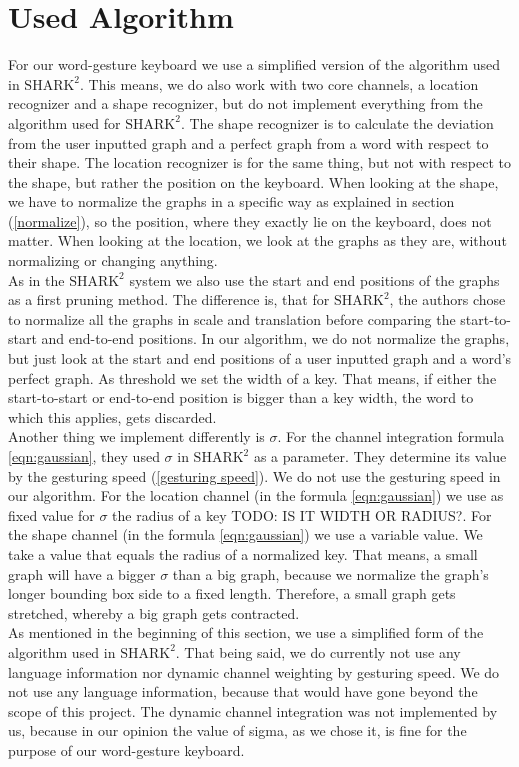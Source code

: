 \section{Used Algorithm}
For our word-gesture keyboard we use a simplified version of the algorithm used in $\text{SHARK}^2$. This means, we do also work with two core channels, a location recognizer and a shape recognizer, but do not implement everything from the algorithm used for $\text{SHARK}^2$. The shape recognizer is to calculate the deviation from the user inputted graph and a perfect graph from a word with respect to their shape. The location recognizer is for the same thing, but not with respect to the shape, but rather the position on the keyboard. When looking at the shape, we have to normalize the graphs in a specific way as explained in section (\ref{normalize}), so the position, where they exactly lie on the keyboard, does not matter. When looking at the location, we look at the graphs as they are, without normalizing or changing anything.\\
As in the $\text{SHARK}^2$ system we also use the start and end positions of the graphs as a first pruning method. The difference is, that for $\text{SHARK}^2$, the authors chose to normalize all the graphs in scale and translation before comparing the start-to-start and end-to-end positions. In our algorithm, we do not normalize the graphs, but just look at the start and end positions of a user inputted graph and a word's perfect graph. As threshold we set the width of a key. That means, if either the start-to-start or end-to-end position is bigger than a key width, the word to which this applies, gets discarded.\\
Another thing we implement differently is $\sigma$. For the channel integration formula \ref{eqn:gaussian}, they used $\sigma$ in $\text{SHARK}^2$ as a parameter. They determine its value by the gesturing speed (\ref{gesturing speed}). We do not use the gesturing speed in our algorithm. For the location channel (in the formula \ref{eqn:gaussian}) we use as fixed value for $\sigma$ the radius of a key TODO: IS IT WIDTH OR RADIUS?. For the shape channel (in the formula \ref{eqn:gaussian}) we use a variable value. We take a value that equals the radius of a normalized key. That means, a small graph will have a bigger $\sigma$ than a big graph, because we normalize the graph's longer bounding box side to a fixed length. Therefore, a small graph gets stretched, whereby a big graph gets contracted.\\
As mentioned in the beginning of this section, we use a simplified form of the algorithm used in $\text{SHARK}^2$. That being said, we do currently not use any language information nor dynamic channel weighting by gesturing speed. We do not use any language information, because that would have gone beyond the scope of this project. The dynamic channel integration was not implemented by us, because in our opinion the value of sigma, as we chose it, is fine for the purpose of our word-gesture keyboard.

